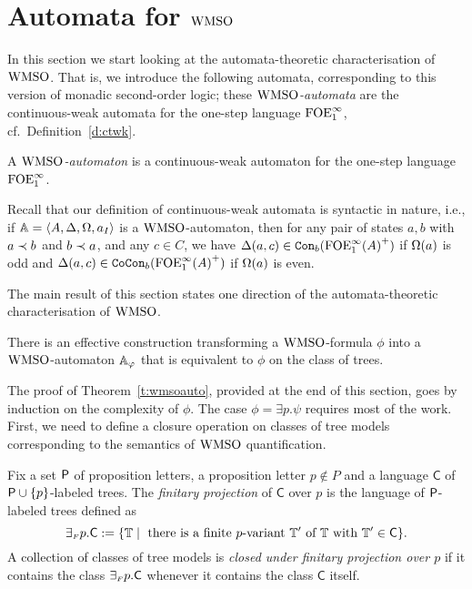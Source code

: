 
\section{Automata for $\wmso$}
   \label{sec:autwmso}

In this section we start looking at the automata-theoretic characterisation of
$\wmso$.
That is, we introduce the following automata, corresponding to this version of
monadic second-order logic; these \emph{$\wmso$-automata} are the continuous-weak
automata for the one-step language $\ofoei$, cf.~Definition~\ref{d:ctwk}.

\begin{definition}
A \emph{$\wmso$-automaton} is a continuous-weak automaton for the one-step
language $\ofoei$.
\end{definition}

Recall that our definition of continuous-weak automata is syntactic in nature,
i.e., if $\bbA = \tup{A,\tmap,\pmap,a_I}$ is a $\wmso$-automaton, then for any
pair of states $a,b$ with $a \ord b$ and $b \ord a$, and any $c\in C$, we have
$\tmap(a,c) \in \cont{{\ofoei(A)}^+}{b}$ if $\pmap(a)$ is odd and $\tmap(a,c)
\in \cocont{{\ofoei(A)}^+}{b}$ if $\pmap(a)$ is even.

The main result of this section states one direction of the automata-theoretic
characterisation of $\wmso$.

\begin{theorem}
\label{t:wmsoauto}
There is an effective construction transforming a $\wmso$-formula $\phi$
into a $\wmso$-automaton $\bbA_{\phi}$ that is equivalent
to $\phi$ on the class of trees.
\end{theorem}

{\color{blue} The proof of Theorem~\ref{t:wmsoauto}, provided at the end of this section, goes by induction on the complexity of
$\phi$. The case $\phi = \exists p. \psi$ requires most of the work. First, we need to define a closure operation on classes of 
tree models corresponding to the semantics of $\wmso$ quantification.}

\begin{definition}\label{def:tree_finproj-w}
Fix a set $\pprop$ of proposition letters, a proposition letter $p \not\in P$ 
and a language $\mathsf{C}$ of $\pprop\cup\{p\}$-labeled trees.
The \emph{finitary projection} of $\mathsf{C}$ over $p$ is the language of 
$\pprop$-labeled trees defined as 
\[
{\finexists} p.\mathsf{C} \df \{\bbT \mid
\text{ there is a finite $p$-variant } \bbT' \text{ of } \bbT \text{ with }
\bbT' \in \mathsf{C}\}.
\]
%
A collection of classes of tree models is \emph{closed under finitary 
projection over $p$} if it contains the class ${{\finexists} p}.\mathsf{C}$ 
whenever it contains the class $\mathsf{C}$ itself.
\end{definition}

